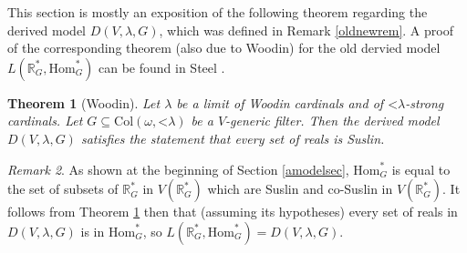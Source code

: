 \documentclass[fleqn, 11pt]{amsart}
\theoremstyle{plain}
\newtheorem{thm}{Theorem}[section]
\theoremstyle{definition}
\theoremstyle{remark}
\newtheorem{rem}[thm]{Remark} \newtheorem*{rem*}{Remark}
\newcommand{\Ord}{\mathrm{Ord}}
\newcommand{\HOD}{\mathrm{HOD}}
\newcommand{\Hom}{\mathrm{Hom}}
\newcommand{\bbR}{\mathbb{R}}
\newcommand{\AD}{\mathsf{AD}}
\newcommand{\Col}{\mathrm{Col}}
\newcommand{\restrict}{\mathord{\restriction}}
\newcommand{\less}{\mathord{<}}
\newcommand{\powerset}{\mathcal{P}}
\begin{document}
This section is mostly an exposition of the following theorem regarding the derived model $D(V,\lambda,G)$, which was defined in Remark \ref{oldnewrem}. A proof of the corresponding theorem (also due to Woodin) for the old dervied model $L(\mathbb{R}^*_G, \Hom^*_G)$ can be found in Steel \cite[Section 9]{SteDMT}.






\begin{thm}[Woodin]\label{thm-DM-at-limit-of-lt-lambda-strongs}
 Let $\lambda$ be a limit of Woodin cardinals and of $\mathord{<}\lambda$-strong cardinals. Let $G \subseteq \Col(\omega,\mathord{<}\lambda)$ be a $V$-generic filter. Then the derived model $D(V,\lambda,G)$ satisfies the statement that every set of reals is Suslin.
\end{thm}

\begin{rem}\label{oldnewequivrem}
As shown at the beginning of Section \ref{amodelsec}, $\Hom^{*}_{G}$ is equal to the set of subsets of $\mathbb{R}^{*}_{G}$ in $V(\mathbb{R}^{*}_{G})$ which are Suslin and co-Suslin in $V(\mathbb{R}^{*}_{G})$. It follows from Theorem \ref{thm-DM-at-limit-of-lt-lambda-strongs} then that (assuming its hypotheses)  every set of reals in $D(V, \lambda, G)$ is in $\Hom^{*}_{G}$, so $L(\mathbb{R}^{*}_{G}, \Hom^{*}_{G}) = D(V, \lambda, G)$. 
\end{rem} 
\end{document}
